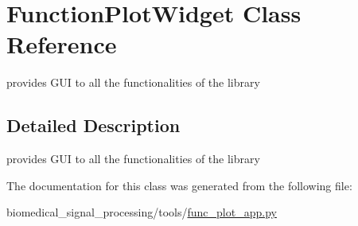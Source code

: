 \hypertarget{classFunctionPlotWidget}{}\section{Function\+Plot\+Widget Class Reference}
\label{classFunctionPlotWidget}


provides G\+UI to all the functionalities of the library  




\subsection{Detailed Description}
provides G\+UI to all the functionalities of the library 

The documentation for this class was generated from the following file\+:\begin{DoxyCompactItemize}
\item 
biomedical\+\_\+signal\+\_\+processing/tools/\hyperlink{func__plot__app_8py}{func\+\_\+plot\+\_\+app.\+py}\end{DoxyCompactItemize}
